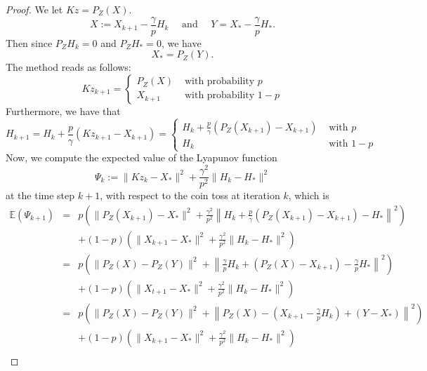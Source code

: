 \begin{proof} 
We let $Kz = P_Z(X)$.   
\begin{equation}
X := X_{k+1} - \frac{\gamma}{p} H_k \quad \mbox{ and } \quad Y = X_* - \frac{\gamma}{p} H_*. 
\end{equation}
Then since $P_Z H_k = 0$ and $P_Z H_* = 0$, we have 
\begin{equation} 
X_* = P_Z(Y). 
\end{equation} 
The method reads as follows: 
\begin{equation}
Kz_{k+1} = \left \{ \begin{array}{ll} P_Z(X) & \mbox{ with probability } p \\ X_{k+1} & \mbox{ with probability } 1 - p \end{array}  \right. 
\end{equation}
Furthermore, we have that 
\begin{equation}
H_{k+1} = H_k + \frac{p}{\gamma} (Kz_{k+1} - X_{k+1}) = 
\left \{ \begin{array}{ll} 
H_k + \frac{p}{\gamma} \left ( P_Z(X_{k+1}) - X_{k+1} \right ) & \mbox{ with  } p \\ H_k & \mbox{ with } 1 - p \end{array}  \right. 
\end{equation}
Now, we compute the expected value of the Lyapunov function 
\begin{equation}
\Psi_k := \|Kz_k - X_*\|^2 + \frac{\gamma^2}{p^2} \|H_k - H_*\|^2 
\end{equation}
at the time step $k+1$, with respect to the coin toss at iteration $k$, which is 
\begin{eqnarray}
\mathbb{E}(\Psi_{k+1}) &=& p \left ( \|P_Z(X_{k+1}) - X_*\|^2 + \frac{\gamma^2}{p^2} \left \|H_k + \frac{p}{\gamma} (P_Z(X_{k+1}) - X_{k+1})  - H_* \right \|^2 \right ) \\
&& + (1-p) \left ( \|X_{k+1} - X_*\|^2 + \frac{\gamma^2}{p^2} \|H_k - H_*\|^2  \right ) \\
&=& p \left ( \|P_Z(X) - P_Z(Y) \|^2 + \left \| \frac{\gamma}{p} H_k + (P_Z(X) - X_{k+1})  - \frac{\gamma}{p} H_* \right \|^2 \right ) \\
&& + (1-p) \left ( \|X_{t+1} - X_*\|^2 + \frac{\gamma^2}{p^2} \|H_k - H_*\|^2  \right ) \\
&=& p \left ( \|P_Z(X) - P_Z(Y) \|^2 + \left \|P_Z(X) - (X_{k+1} - \frac{\gamma}{p} H_k )  + (Y - X_*) \right \|^2 \right ) \\
&& + (1-p) \left ( \|X_{k+1} - X_*\|^2 + \frac{\gamma^2}{p^2} \|H_k - H_*\|^2  \right ) \\

\end{eqnarray}
\end{proof}
